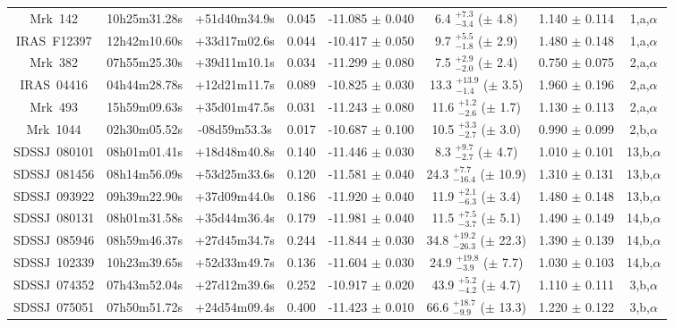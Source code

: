 \documentclass[a4paper,fleqn,usenatbib]{mnras}
\begin{document}
\begin{appendix}
\begin{longtable}{cccccccc}
Mrk~142 & 10h25m31.28s & +51d40m34.9s & 0.045 & -11.085 $\pm$ 0.040 & 6.4 $_{-3.4}^{+7.3}$ ($\pm$ 4.8) &    1.140 $\pm$ 0.114 & 1,a,$\alpha$ \\
IRAS~F12397 & 12h42m10.60s & +33d17m02.6s & 0.044 & -10.417 $\pm$ 0.050 & 9.7 $_{-1.8}^{+5.5}$ ($\pm$ 2.9) &    1.480 $\pm$ 0.148 & 1,a,$\alpha$ \\
Mrk~382 & 07h55m25.30s & +39d11m10.1s & 0.034 & -11.299 $\pm$ 0.080 & 7.5 $_{-2.0}^{+2.9}$ ($\pm$ 2.4) &    0.750 $\pm$ 0.075 & 2,a,$\alpha$ \\
IRAS~04416 & 04h44m28.78s & +12d21m11.7s & 0.089 & -10.825 $\pm$ 0.030 & 13.3 $_{-1.4}^{+13.9}$ ($\pm$ 3.5) &    1.960 $\pm$ 0.196 & 2,a,$\alpha$ \\
Mrk~493 & 15h59m09.63s & +35d01m47.5s & 0.031 & -11.243 $\pm$ 0.080 & 11.6 $_{-2.6}^{+1.2}$ ($\pm$ 1.7) &    1.130 $\pm$ 0.113 & 2,a,$\alpha$ \\
Mrk~1044 & 02h30m05.52s & -08d59m53.3s & 0.017 & -10.687 $\pm$ 0.100 & 10.5 $_{-2.7}^{+3.3}$ ($\pm$ 3.0) &    0.990 $\pm$ 0.099 & 2,b,$\alpha$ \\
SDSSJ~080101 & 08h01m01.41s & +18d48m40.8s & 0.140 & -11.446 $\pm$ 0.030 & 8.3 $_{-2.7}^{+9.7}$ ($\pm$ 4.7) &    1.010 $\pm$ 0.101 & 13,b,$\alpha$ \\
SDSSJ~081456 & 08h14m56.09s & +53d25m33.6s & 0.120 & -11.581 $\pm$ 0.040 & 24.3 $_{-16.4}^{+7.7}$ ($\pm$ 10.9) &   1.310 $\pm$ 0.131 & 13,b,$\alpha$ \\
SDSSJ~093922 & 09h39m22.90s & +37d09m44.0s & 0.186 & -11.920 $\pm$ 0.040 & 11.9 $_{-6.3}^{+2.1}$ ($\pm$ 3.4) &   1.480 $\pm$ 0.148 & 13,b,$\alpha$ \\
SDSSJ~080131 & 08h01m31.58s & +35d44m36.4s & 0.179 & -11.981 $\pm$ 0.040 & 11.5 $_{-3.7}^{+7.5}$ ($\pm$ 5.1) &   1.490 $\pm$ 0.149 & 14,b,$\alpha$ \\
SDSSJ~085946 & 08h59m46.37s & +27d45m34.7s & 0.244 & -11.844 $\pm$ 0.030 & 34.8 $_{-26.3}^{+19.2}$ ($\pm$ 22.3) &   1.390 $\pm$ 0.139 & 14,b,$\alpha$ \\
SDSSJ~102339 & 10h23m39.65s & +52d33m49.7s & 0.136 & -11.604 $\pm$ 0.030 & 24.9 $_{-3.9}^{+19.8}$ ($\pm$ 7.7) &   1.030 $\pm$ 0.103 & 14,b,$\alpha$ \\
SDSSJ~074352 & 07h43m52.04s & +27d12m39.6s & 0.252 & -10.917 $\pm$ 0.020 & 43.9 $_{-4.2}^{+5.2}$ ($\pm$ 4.7) &    1.110 $\pm$ 0.111 & 3,b,$\alpha$ \\
SDSSJ~075051 & 07h50m51.72s & +24d54m09.4s & 0.400 & -11.423 $\pm$ 0.010 & 66.6 $_{-9.9}^{+18.7}$ ($\pm$ 13.3) &    1.220 $\pm$ 0.122 & 3,b,$\alpha$ \\

\end{longtable}
\end{appendix}
\end{document}
